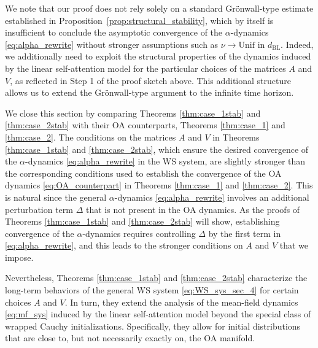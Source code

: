 \documentclass[10pt]{article}
\theoremstyle{definition}
\theoremstyle{definition}
\numberwithin{equation}{section}
\newcommand{\BL}{\mathrm{BL}}
\newcommand{\Unif}{\mathrm{Unif}}
\begin{document}
We note that our proof does not rely solely on a standard Grönwall-type estimate established in Proposition~\ref{prop:structural_stability}, which by itself is insufficient to conclude the asymptotic convergence of the $\alpha$-dynamics \eqref{eq:alpha_rewrite} without stronger assumptions such as $\nu\to \Unif$ in $d_{\BL}$.
Indeed, we additionally need to exploit the structural properties of the dynamics induced by the linear self-attention model for the particular choices of the matrices $A$ and $V$, as reflected in Step 1 of the proof sketch above. This additional structure allows us to extend the Grönwall-type argument to the infinite time horizon.

We close this section by comparing Theorems \ref{thm:case_1stab} and \ref{thm:case_2stab} with their OA counterparts, Theorems \ref{thm:case_1} and \ref{thm:case_2}.
The conditions on the matrices $A$ and $V$ in Theorems \ref{thm:case_1stab} and \ref{thm:case_2stab}, which ensure the desired convergence of the $\alpha$-dynamics \eqref{eq:alpha_rewrite} in the WS system, are slightly stronger than the corresponding conditions used to establish the convergence of the OA dynamics \eqref{eq:OA_counterpart} in Theorems \ref{thm:case_1} and \ref{thm:case_2}.
This is natural since the general $\alpha$-dynamics \eqref{eq:alpha_rewrite} involves an additional perturbation term $\Delta$ that is not present in the OA dynamics.
As the proofs of Theorems \ref{thm:case_1stab} and \ref{thm:case_2stab} will show, establishing convergence of the $\alpha$-dynamics requires controlling $\Delta$ by the first term in \eqref{eq:alpha_rewrite}, and this leads to the stronger conditions on $A$ and $V$ that we impose.

Nevertheless, Theorems \ref{thm:case_1stab} and \ref{thm:case_2stab} characterize the long-term behaviors of the general WS system \eqref{eq:WS_sys_sec_4} for certain choices $A$ and $V$. In turn, they extend the analysis of the mean-field dynamics \eqref{eq:mf_sys} induced by the linear self-attention model beyond the special class of wrapped Cauchy initializations.
Specifically, they allow for initial distributions that are close to, but not necessarily exactly on, the OA manifold.
\end{document}
